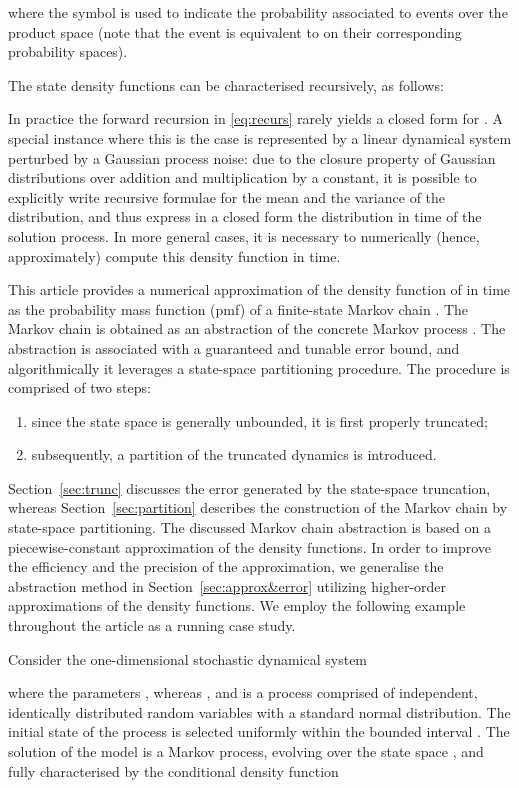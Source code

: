 \documentclass{LMCS}
\begin{document}
where the symbol  is used to indicate the probability associated to events over the product space 
(note that the event  is equivalent to  on their corresponding probability spaces).

The state density functions  can be characterised recursively, as follows: 

In practice the forward recursion in \eqref{eq:recurs} rarely yields a closed form for .  
A special instance where this is the case is represented by a linear dynamical system perturbed by a Gaussian process noise: 
due to the closure property of Gaussian distributions over addition and multiplication by a constant,  
it is possible to explicitly write recursive formulae for the mean and the variance of the distribution, 
and thus express in a closed form the distribution in time of the solution process.  
In more general cases, it is necessary to numerically (hence, approximately) compute this density function in time.    

\medskip

This article provides a numerical approximation of the density function of  in time 
as the probability mass function (pmf) of a finite-state Markov chain .  
The Markov chain  is obtained as an abstraction of the concrete Markov process . 
The abstraction is associated with a guaranteed and tunable error bound,
and algorithmically it leverages a state-space partitioning procedure.  
The procedure is comprised of two steps: 
\begin{enumerate} 
\item 
since the state space  is generally unbounded, 
it is first properly truncated; 
\item 
subsequently,  
a partition of the truncated dynamics is introduced. 
\end{enumerate} 

Section~\ref{sec:trunc} discusses the error generated by the state-space truncation, 
whereas Section~\ref{sec:partition} describes the construction of the Markov chain by state-space partitioning.
The discussed Markov chain abstraction is based on a piecewise-constant approximation of the density functions. 
In order to improve the efficiency and the precision of the approximation, 
we generalise the abstraction method in Section~\ref{sec:approx&error} utilizing higher-order approximations of the density functions.
We employ the following example throughout the article as a running case study. 
\begin{exa}
\label{ex:linear_1d}
Consider the one-dimensional stochastic dynamical system

where the parameters , whereas , 
and  is a process comprised of independent, identically distributed random variables with a standard normal distribution. 
The initial state of the process is selected uniformly within the bounded interval . 
The solution of the model is a Markov process, 
evolving over the state space , 
and fully characterised by the conditional density function 

\end{exa}
\end{document}
